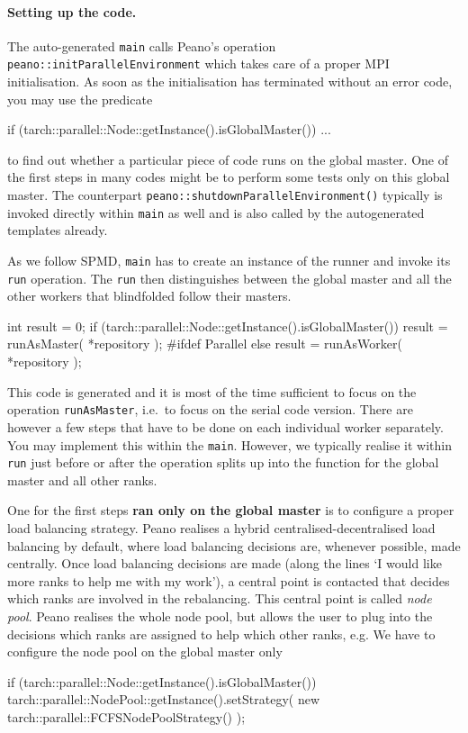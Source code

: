 \paragraph{Setting up the code.}

The auto-generated \texttt{main} calls Peano's operation \newline
\texttt{peano::initParallelEnvironment} which takes care of a proper MPI
initialisation. 
As soon as the initialisation has terminated without an error code, you may use
the predicate

\begin{code}
if (tarch::parallel::Node::getInstance().isGlobalMaster()) {
  ...
}
\end{code}

\noindent
to find out whether a particular piece of code runs on the global master. 
One of the first steps in many codes might be to perform some tests only on this
global master.
The counterpart \texttt{peano::shutdownParallelEnvironment()} typically is
invoked directly within \texttt{main} as well and is also called by the
autogenerated templates already.

As we follow SPMD, \texttt{main} has to create an instance of the runner and
invoke its \texttt{run} operation. 
The \texttt{run} then distinguishes between the global master and all the other
workers that blindfolded follow their masters. 
\begin{code}
  int result = 0;
  if (tarch::parallel::Node::getInstance().isGlobalMaster()) {
    result = runAsMaster( *repository );
  }
  #ifdef Parallel
  else {
    result = runAsWorker( *repository );
  }
\end{code}

\noindent
This code is generated and it is most of the time sufficient to focus on the
operation \texttt{runAsMaster}, i.e.~to focus on the serial code version. There
are however a few steps that have to be done on each individual worker
separately. 
You may implement this within the \texttt{main}.
However, we typically realise it within \texttt{run} just before or after the
operation splits up into the function for the global master and all other ranks.


One for the first steps {\bf ran only on the global master} is to configure a
proper load balancing strategy. 
Peano realises a hybrid centralised-decentralised load balancing by default,
where load balancing decisions are, whenever possible, made centrally. 
Once load balancing decisions are made (along the lines `I would like more
ranks to help me with my work'), a central point is contacted that decides which
ranks are involved in the rebalancing.
This central point is called {\em node pool}.
Peano realises the whole node pool, but allows the user to plug into the
decisions which ranks are assigned to help which other ranks, e.g.
We have to configure the node pool on the global master only
\begin{code}
if (tarch::parallel::Node::getInstance().isGlobalMaster()) {
  tarch::parallel::NodePool::getInstance().setStrategy(
    new tarch::parallel::FCFSNodePoolStrategy()
  );
}
\end{code}

